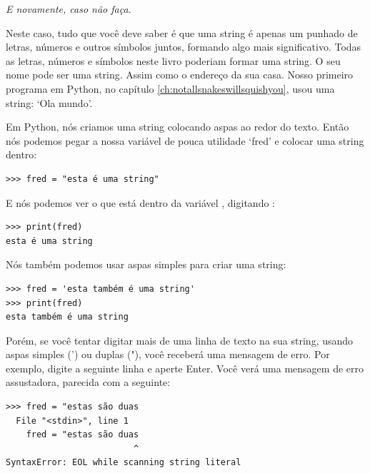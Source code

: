 \noindent
\emph{E novamente, caso não faça.}

Neste caso, tudo que você deve saber é que uma string é apenas um punhado de letras, números e outros símbolos juntos, formando algo mais significativo. Todas as letras, números e símbolos neste livro poderiam formar uma string. O seu nome pode ser uma string. Assim como o endereço da sua casa. Nosso primeiro programa em Python, no capítulo \ref{ch:notallsnakeswillsquishyou}, usou uma string: `Ola mundo'.
\par
Em Python, nós criamos uma string colocando aspas ao redor do texto. Então nós podemos pegar a nossa variável de pouca utilidade `fred' e colocar uma string dentro:

\begin{listing}
\begin{verbatim}
>>> fred = "esta é uma string"
\end{verbatim}
\end{listing}

\noindent
E nós podemos ver o que está dentro da variável , digitando :

\begin{listing}
\begin{verbatim}
>>> print(fred)
esta é uma string
\end{verbatim}
\end{listing}

\noindent
Nós também podemos usar aspas simples para criar uma string:

\begin{listing}
\begin{verbatim}
>>> fred = 'esta também é uma string'
>>> print(fred)
esta também é uma string
\end{verbatim}
\end{listing}

Porém, se você tentar digitar mais de uma linha de texto na sua string, usando aspas simples (') ou duplas ("), você receberá uma mensagem de erro. Por exemplo, digite a seguinte linha e aperte Enter. Você verá uma mensagem de erro assustadora, parecida com a seguinte:

\begin{listing}
\begin{verbatim}
>>> fred = "estas são duas
  File "<stdin>", line 1
    fred = "estas são duas
                         ^
SyntaxError: EOL while scanning string literal
\end{verbatim}
\end{listing}

